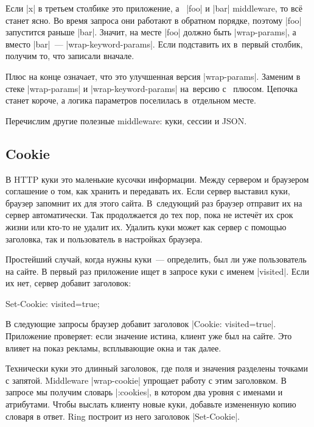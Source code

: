 Если \spverb|x| в третьем столбике это приложение, а~ \spverb|foo| и
\spverb|bar| middleware, то вс\"{е} станет ясно. Во время запроса они работают в
обратном порядке, поэтому \spverb|foo| запустится раньше \spverb|bar|. Значит,
на месте \spverb|foo| должно быть \spverb|wrap-params|, а вместо
\spverb|bar|~--- \spverb|wrap-keyword-params|. Если подставить их в~первый
столбик, получим то, что записали вначале.

Плюс на конце означает, что это улучшенная версия \spverb|wrap-params|. Заменим
в стеке \spverb|wrap-params| и \spverb|wrap-keyword-params| на~версию с~
плюсом. Цепочка станет короче, а логика параметров поселилась в~отдельном месте.

Перечислим другие полезные middleware: куки, сессии и JSON.

\subsection{Cookie}


В HTTP куки это маленькие кусочки информации. Между сервером и браузером
соглашение о том, как хранить и передавать их. Если сервер выставил куки,
браузер запомнит их для этого сайта. В~следующий раз браузер отправит их на
сервер автоматически. Так продолжается до тех пор, пока не истеч\"{е}т их срок
жизни или кто-то не удалит их. Удалить куки может как сервер с помощью
заголовка, так и пользователь в настройках браузера.

Простейший случай, когда нужны куки~--- определить, был ли уже пользователь на
сайте. В первый раз приложение ищет в запросе куки с именем
\spverb|visited|. Если их нет, сервер добавит заголовок:

\begin{english}
  \begin{http}
Set-Cookie: visited=true;
  \end{http}
\end{english}

В следующие запросы браузер добавит заголовок \spverb|Cookie: visited=true|.
Приложение проверяет: если значение истина, клиент уже был на сайте. Это влияет
на показ рекламы, всплывающие окна и так далее.

Технически куки это длинный заголовок, где поля и значения разделены точками с
запятой. Middleware \spverb|wrap-cookie| упрощает работу с этим заголовком. В
запросе мы получим словарь \spverb|:cookies|, в котором два уровня с именами и
атрибутами. Чтобы выслать клиенту новые куки, добавьте измененную копию словаря
в ответ. Ring построит из него заголовок \spverb|Set-Cookie|.

